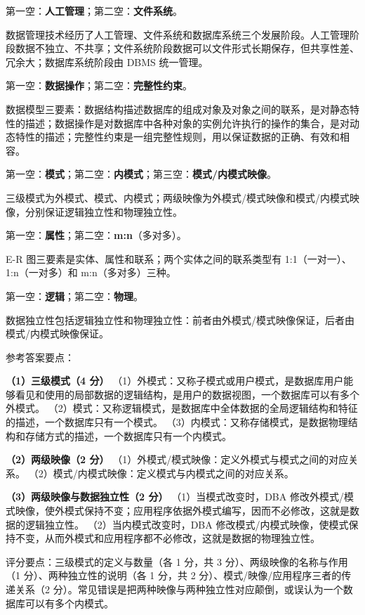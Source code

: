 \documentclass[a4paper,11pt]{article}
\begin{document}

\q 第一空：\textbf{人工管理}；第二空：\textbf{文件系统}。\begin{analysis}数据管理技术经历了人工管理、文件系统和数据库系统三个发展阶段。人工管理阶段数据不独立、不共享；文件系统阶段数据可以文件形式长期保存，但共享性差、冗余大；数据库系统阶段由 DBMS 统一管理。\end{analysis}

\q 第一空：\textbf{数据操作}；第二空：\textbf{完整性约束}。\begin{analysis}数据模型三要素：数据结构描述数据库的组成对象及对象之间的联系，是对静态特性的描述；数据操作是对数据库中各种对象的实例允许执行的操作的集合，是对动态特性的描述；完整性约束是一组完整性规则，用以保证数据的正确、有效和相容。\end{analysis}

\q 第一空：\textbf{模式}；第二空：\textbf{内模式}；第三空：\textbf{模式/内模式映像}。\begin{analysis}三级模式为外模式、模式、内模式；两级映像为外模式/模式映像和模式/内模式映像，分别保证逻辑独立性和物理独立性。\end{analysis}

\q 第一空：\textbf{属性}；第二空：\textbf{m:n}（多对多）。\begin{analysis}E-R 图三要素是实体、属性和联系；两个实体之间的联系类型有 1:1（一对一）、1:n（一对多）和 m:n（多对多）三种。\end{analysis}

\q 第一空：\textbf{逻辑}；第二空：\textbf{物理}。\begin{analysis}数据独立性包括逻辑独立性和物理独立性：前者由外模式/模式映像保证，后者由模式/内模式映像保证。\end{analysis}


\q 参考答案要点：

\textbf{（1）三级模式（4 分）}
（1）外模式：又称子模式或用户模式，是数据库用户能够看见和使用的局部数据的逻辑结构，是用户的数据视图，一个数据库可以有多个外模式。
（2）模式：又称逻辑模式，是数据库中全体数据的全局逻辑结构和特征的描述，一个数据库只有一个模式。
（3）内模式：又称存储模式，是数据物理结构和存储方式的描述，一个数据库只有一个内模式。

\textbf{（2）两级映像（2 分）}
（1）外模式/模式映像：定义外模式与模式之间的对应关系。
（2）模式/内模式映像：定义模式与内模式之间的对应关系。

\textbf{（3）两级映像与数据独立性（2 分）}
（1）当模式改变时，DBA 修改外模式/模式映像，使外模式保持不变；应用程序依据外模式编写，因而不必修改，这就是数据的逻辑独立性。
（2）当内模式改变时，DBA 修改模式/内模式映像，使模式保持不变，从而外模式和应用程序都不必修改，这就是数据的物理独立性。
\begin{analysis}评分要点：三级模式的定义与数量（各 1 分，共 3 分）、两级映像的名称与作用（1 分）、两种独立性的说明（各 1 分，共 2 分）、模式/映像/应用程序三者的传递关系（2 分）。常见错误是把两种映像与两种独立性对应颠倒，或误认为一个数据库可以有多个内模式。\end{analysis}
\end{document}
